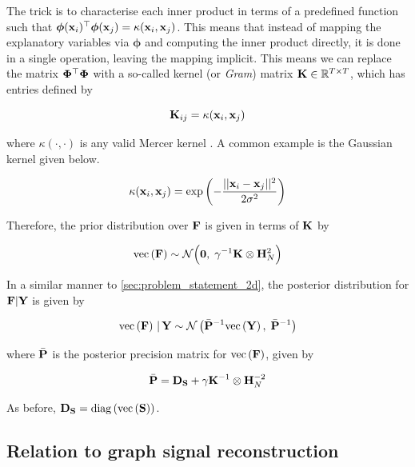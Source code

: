 The trick is to characterise each inner product in terms of a predefined function such that $\boldsymbol{\phi}(\mathbf{x}_i)^\top\boldsymbol{\phi}(\mathbf{x}_j) = \kappa(\mathbf{x}_i, \mathbf{x}_j)$. This means that instead of mapping the explanatory variables via $\boldsymbol{\phi}$ and computing the inner product directly, it is done in a single operation, leaving the mapping implicit. This means we can replace the matrix $\mathbf{\Phi}^\top \mathbf{\Phi}$ with a so-called kernel (or \textit{Gram}) matrix $\mathbf{K} \in \mathbb{R}^{T \times T}$, which has entries defined by 

\begin{equation}
    \label{eq:kernel_matrix}
    \mathbf{K}_{ij} = \kappa(\mathbf{x}_i, \mathbf{x}_j)
\end{equation}

where $\kappa(\cdot, \cdot)$ is any valid Mercer kernel \citep{Rasmussen2005}. A common example is the Gaussian kernel given below. 

\begin{equation}
    \kappa(\mathbf{x}_i, \mathbf{x}_j) = \exp\left(-\frac{|| \mathbf{x}_i - \mathbf{x}_j ||^2}{2 \sigma^2}\right)
\end{equation}

Therefore, the prior distribution over $\mathbf{F}$ is given in terms of $\mathbf{K}$ by 

\begin{equation}
    \label{eq:F_prior3}
    \text{\textup{vec}}\left(\mathbf{F}\right) \sim \mathcal{N}\Big(\mathbf{0}, \; \gamma^{-1} \mathbf{K} \otimes \mathbf{H}_N^{2}\Big)
\end{equation}

In a similar manner to \cref{sec:problem_statement_2d}, the posterior distribution for $\mathbf{F} | \mathbf{Y}$ is given by 

\begin{equation}
    \label{eq:F_post_kgr}
    \text{\textup{vec}}\left(\mathbf{F}\right) \, | \, \mathbf{Y} \sim \mathcal{N}\left(\bar{\mathbf{P}}^{-1}\text{\textup{vec}}\left(\mathbf{Y}\right), \; \bar{\mathbf{P}}^{-1}\right)
\end{equation}

where $\bar{\mathbf{P}}$ is the posterior precision matrix for $\text{\textup{vec}}\left(\mathbf{F}\right)$, given by

\begin{equation}
    \label{eq:P_post_kgr}
    \bar{\mathbf{P}} = \mathbf{D}_{\mathbf{S}} + \gamma \mathbf{K}^{-1} \otimes \mathbf{H}_N^{-2}
\end{equation}

As before, $\mathbf{D}_{\mathbf{S}} = \text{\textup{diag}}\left(\text{\textup{vec}}\left(\mathbf{S}\right)\right)$. 

\subsection{Relation to graph signal reconstruction}

